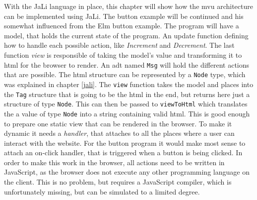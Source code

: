 

With the JaLi language in place, this chapter will show how the \gls{mvu} architecture can be implemented using JaLi. The button example will be continued and his somewhat influenced from the Elm button example.
The program will have a model, that holds the current state of the program. An update function defining how to handle each possible action, like \textit{Increment} and \textit{Decrement}. The last function \textit{view} is responsible of taking the model's value and transforming it to \gls{html} for the browser to render.
An \gls{adt} named \texttt{Msg} will hold the different actions that are possible. The \gls{html} structure can be represented by a \texttt{Node} type, which was explained in chapter \ref{jali}.
The \texttt{view} function takes the model and places into the \texttt{Tag} structure that is going to be the \gls{html} in the end, but returns here just a structure of type \texttt{Node}. This can then be passed to \texttt{viewToHtml} which translates the a value of type \texttt{Node} into a string containing valid \gls{html}.
This is good enough to prepare one static view that can be rendered in the browser.
To make it dynamic it needs a \textit{handler}, that attaches to all the places where a user can interact with the website. For the button program it would make most sense to attach an on-click handler, that is triggered when a button is being clicked. In order to make this work in the browser, all actions need to be written in JavaScript, as the browser does not execute any other programming language on the client. This is no problem, but requires a JavaScript compiler, which is unfortunately missing, but can be simulated to a limited degree.

